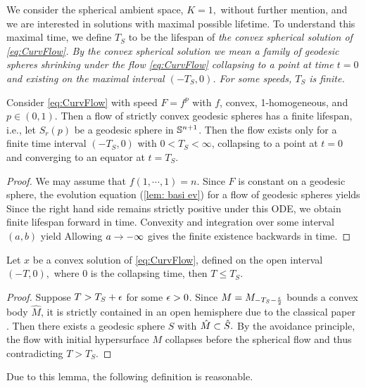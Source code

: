 \documentclass{amsart}
\begin{document}
We consider the spherical ambient space, $K=1,$ without further mention, and we are interested in solutions with maximal possible lifetime. To understand this maximal time, we define $T_S$ to be the lifespan of \it{the} convex spherical solution of \eqref{eq:CurvFlow}. By the convex spherical solution we mean a family of geodesic spheres shrinking under the flow \eqref{eq:CurvFlow} collapsing to a point at time $t=0$ and existing on the maximal interval \((-T_S, 0)\). For some speeds, \(T_S\) is finite.

\begin{lemma}
 Consider \eqref{eq:CurvFlow} with speed \(F = f^p\) with \(f\), convex, 1-homogeneous, and \(p \in (0,1)\). Then a flow of strictly convex geodesic spheres has a finite lifespan, i.e., let $S_r(p)$ be a geodesic sphere in $\S^{n+1}$. Then the flow exists only for a finite time interval \((-T_S,0)\) with \(0 < T_S < \infty\), collapsing to a point at \(t=0\) and converging to an equator at \(t=T_S\).
\end{lemma}

\begin{proof}
We may assume that $f(1,\cdots,1)=n.$
Since $F$ is constant on a geodesic sphere, the evolution equation (\ref{lem: basi ev}) for a flow of geodesic spheres yields
Since the right hand side remains strictly positive under this ODE, we obtain finite lifespan forward in time.
Convexity and integration over some interval $(a,b)$ yield
Allowing $a\ra-\8$ gives the finite existence backwards in time.
\end{proof}

\begin{lemma}
Let $x$ be a convex solution of \eqref{eq:CurvFlow}, defined on the open interval $(-T,0),$ where $0$ is the collapsing time, then $T\leq T_S.$
\end{lemma}

\begin{proof}
Suppose $T>T_S+\e$ for some $\e>0$. Since $M=M_{-T_S-\fr{\e}{2}}$ bounds a convex body $\hat{M}$, it is strictly contained in an open hemisphere due to the classical paper \cite{CarmoWarner:/1970}. Then there exists a geodesic sphere $S$ with $\hat{M}\sub\hat{S}.$ By the avoidance principle, the flow with initial hypersurface $M$ collapses before the spherical flow and thus contradicting $T>T_S$.
\end{proof}

Due to this lemma, the following definition is reasonable.
\end{document}
